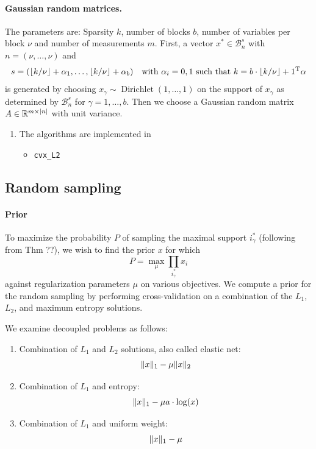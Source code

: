 \documentclass{article} %
\begin{document}
\paragraph{Gaussian random matrices.} The parameters are: Sparsity $k$, number of blocks $b$, number of variables per block $\nu$ and number of measurements $m$.
First, a vector $x^*\in \mathcal B_n^s$ with $n = (\nu, \dots, \nu)$ and
\begin{equation*}
s = (\lfloor k/\nu\rfloor + \alpha_1, \dots, \lfloor k/\nu\rfloor + \alpha_b)\quad\text{with $\alpha_i = 0, 1$ such that $k = b\cdot \lfloor k/\nu\rfloor + 1^{\rm T} \alpha$}
\end{equation*}
is generated by choosing $x_\gamma \sim \operatorname{Dirichlet}(1,
\dots, 1)$ on the support of $x_\gamma$ as determined by $\mathcal
B_n^s$ for $\gamma = 1, \dots, b$. Then we choose a Gaussian random matrix $A\in \mathbb{R}^{m\times |n|}$ with unit variance.

\begin{enumerate}
  \item The algorithms are implemented in
    \begin{itemize}
      \item \texttt{cvx\_L2}
      \end{itemize}
\end{enumerate}

\subsection{Random sampling}
\paragraph{Prior}
To maximize the probability $P$ of sampling the maximal support $i^*_\gamma$ (following from Thm ??), we wish to find the prior $x$ for which
\begin{equation}
P = \max_{\mu} \prod_{i^*_\gamma} x_i
\end{equation}
against regularization parameters $\mu$ on various objectives. We compute a prior for the random sampling by performing cross-validation on a combination of the $L_1$, $L_2$, and maximum entropy solutions.

We examine decoupled problems as follows:
\begin{enumerate}
\item Combination of $L_1$ and $L_2$ solutions, also called elastic net:
\begin{equation}
\lVert x\rVert_1 - \mu \lVert x\rVert_2
\end{equation}
\item Combination of $L_1$ and entropy:
\begin{equation}
\lVert x\rVert_1 - \mu a \cdot \log(x)
\end{equation}
\item Combination of $L_1$ and uniform weight:
\begin{equation}
\lVert x\rVert_1 - \mu
\end{equation}
\end{enumerate}
\end{document}
